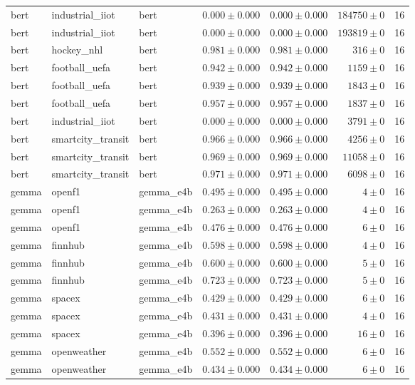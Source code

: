 \begin{table}[htbp]
\begin{tabular}{l l l r r r r}
bert & industrial\_iiot & bert & $0.000\pm0.000$ & $0.000\pm0.000$ & $184750\pm0$ & 16 \\
bert & industrial\_iiot & bert & $0.000\pm0.000$ & $0.000\pm0.000$ & $193819\pm0$ & 16 \\
bert & hockey\_nhl & bert & $0.981\pm0.000$ & $0.981\pm0.000$ & $316\pm0$ & 16 \\
bert & football\_uefa & bert & $0.942\pm0.000$ & $0.942\pm0.000$ & $1159\pm0$ & 16 \\
bert & football\_uefa & bert & $0.939\pm0.000$ & $0.939\pm0.000$ & $1843\pm0$ & 16 \\
bert & football\_uefa & bert & $0.957\pm0.000$ & $0.957\pm0.000$ & $1837\pm0$ & 16 \\
bert & industrial\_iiot & bert & $0.000\pm0.000$ & $0.000\pm0.000$ & $3791\pm0$ & 16 \\
bert & smartcity\_transit & bert & $0.966\pm0.000$ & $0.966\pm0.000$ & $4256\pm0$ & 16 \\
bert & smartcity\_transit & bert & $0.969\pm0.000$ & $0.969\pm0.000$ & $11058\pm0$ & 16 \\
bert & smartcity\_transit & bert & $0.971\pm0.000$ & $0.971\pm0.000$ & $6098\pm0$ & 16 \\
gemma & openf1 & gemma\_e4b & $0.495\pm0.000$ & $0.495\pm0.000$ & $4\pm0$ & 16 \\
gemma & openf1 & gemma\_e4b & $0.263\pm0.000$ & $0.263\pm0.000$ & $4\pm0$ & 16 \\
gemma & openf1 & gemma\_e4b & $0.476\pm0.000$ & $0.476\pm0.000$ & $6\pm0$ & 16 \\
gemma & finnhub & gemma\_e4b & $0.598\pm0.000$ & $0.598\pm0.000$ & $4\pm0$ & 16 \\
gemma & finnhub & gemma\_e4b & $0.600\pm0.000$ & $0.600\pm0.000$ & $5\pm0$ & 16 \\
gemma & finnhub & gemma\_e4b & $0.723\pm0.000$ & $0.723\pm0.000$ & $5\pm0$ & 16 \\
gemma & spacex & gemma\_e4b & $0.429\pm0.000$ & $0.429\pm0.000$ & $6\pm0$ & 16 \\
gemma & spacex & gemma\_e4b & $0.431\pm0.000$ & $0.431\pm0.000$ & $4\pm0$ & 16 \\
gemma & spacex & gemma\_e4b & $0.396\pm0.000$ & $0.396\pm0.000$ & $16\pm0$ & 16 \\
gemma & openweather & gemma\_e4b & $0.552\pm0.000$ & $0.552\pm0.000$ & $6\pm0$ & 16 \\
gemma & openweather & gemma\_e4b & $0.434\pm0.000$ & $0.434\pm0.000$ & $6\pm0$ & 16 \\

\end{tabular}
\end{table}

